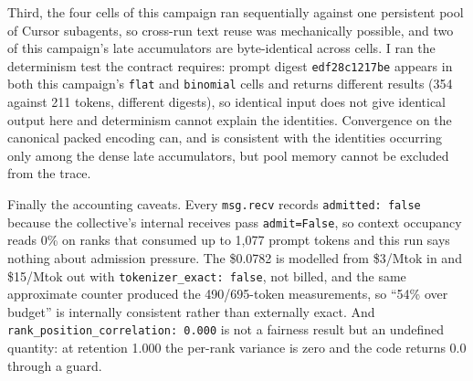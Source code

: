 \documentclass[11pt]{article}
\begin{document}
Third, the four cells of this campaign ran sequentially against one persistent pool of
Cursor subagents, so cross-run text reuse was mechanically possible, and two of this
campaign's late accumulators are byte-identical across cells. I ran the determinism test
the contract requires: prompt digest \texttt{edf28c1217be} appears in both this campaign's
\texttt{flat} and \texttt{binomial} cells and returns different results (354 against 211
tokens, different digests), so identical input does not give identical output here and
determinism cannot explain the identities. Convergence on the canonical packed encoding
can, and is consistent with the identities occurring only among the dense late
accumulators, but pool memory cannot be excluded from the trace.

Finally the accounting caveats. Every \texttt{msg.recv} records \texttt{admitted: false}
because the collective's internal receives pass \texttt{admit=False}, so context occupancy
reads 0\% on ranks that consumed up to 1{,}077 prompt tokens and this run says nothing
about admission pressure. The \$0.0782 is modelled from \$3/Mtok in and \$15/Mtok out with
\texttt{tokenizer\_exact: false}, not billed, and the same approximate counter produced the
490/695-token measurements, so ``54\% over budget'' is internally consistent rather than
externally exact. And \texttt{rank\_position\_correlation: 0.000} is not a fairness result
but an undefined quantity: at retention 1.000 the per-rank variance is zero and the code
returns 0.0 through a guard.
\end{document}
